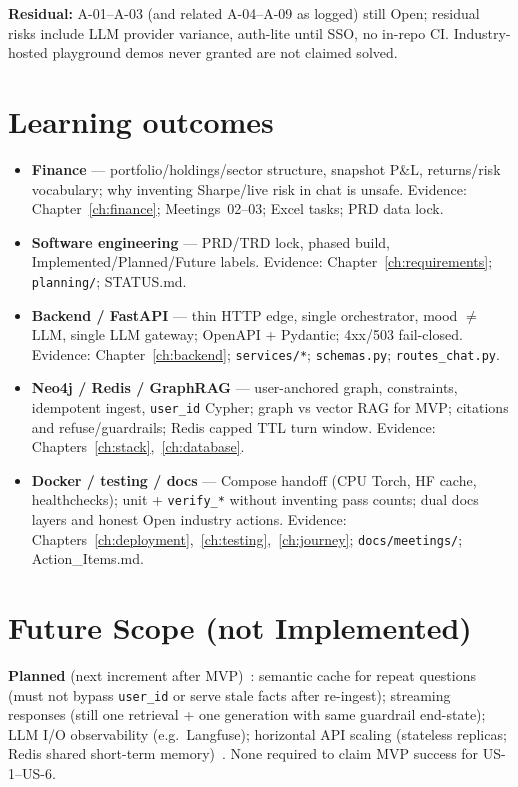 \noindent
\textbf{Residual:} A-01--A-03 (and related A-04--A-09 as logged) still Open; residual risks include LLM provider variance, auth-lite until SSO, no in-repo CI. Industry-hosted playground demos never granted are not claimed solved.

\section{Learning outcomes}

\begin{itemize}[leftmargin=*]
  \item \textbf{Finance} --- portfolio/holdings/sector structure, snapshot P\&L, returns/risk vocabulary; why inventing Sharpe/live risk in chat is unsafe. Evidence: Chapter~\ref{ch:finance}; Meetings~02--03; Excel tasks; PRD data lock.
  \item \textbf{Software engineering} --- PRD/TRD lock, phased build, Implemented/Planned/Future labels. Evidence: Chapter~\ref{ch:requirements}; \texttt{planning/}; STATUS.md.
  \item \textbf{Backend / FastAPI} --- thin HTTP edge, single orchestrator, mood $\neq$ LLM, single LLM gateway; OpenAPI + Pydantic; 4xx/503 fail-closed. Evidence: Chapter~\ref{ch:backend}; \texttt{services/*}; \texttt{schemas.py}; \texttt{routes\_chat.py}.
  \item \textbf{Neo4j / Redis / GraphRAG} --- user-anchored graph, constraints, idempotent ingest, \texttt{user\_id} Cypher; graph vs vector RAG for MVP; citations and refuse/guardrails; Redis capped TTL turn window. Evidence: Chapters~\ref{ch:stack},~\ref{ch:database}.
  \item \textbf{Docker / testing / docs} --- Compose handoff (CPU Torch, HF cache, healthchecks); unit + \texttt{verify\_*} without inventing pass counts; dual docs layers and honest Open industry actions. Evidence: Chapters~\ref{ch:deployment},~\ref{ch:testing},~\ref{ch:journey}; \texttt{docs/meetings/}; Action\_Items.md.
\end{itemize}

\section{Future Scope (not Implemented)}

\textbf{Planned} (next increment after MVP)~\cite{prd}: semantic cache for repeat questions (must not bypass \texttt{user\_id} or serve stale facts after re-ingest); streaming responses (still one retrieval + one generation with same guardrail end-state); LLM I/O observability (e.g.\ Langfuse); horizontal API scaling (stateless replicas; Redis shared short-term memory)~\cite{trd}. None required to claim MVP success for US-1--US-6.

